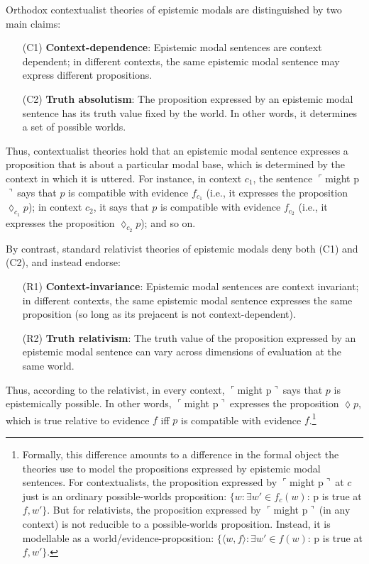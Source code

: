 \documentclass[11pt]{article}
\newcommand{\ul}{$\ulcorner$}
\newcommand{\ur}{$\urcorner\ $}
\begin{document}
\begin{doublespace}
Orthodox contextualist theories of epistemic modals are distinguished by two main claims:

\begin{itemize}
\item[(C1)] {\bf Context-dependence}: Epistemic modal sentences are context dependent; in different contexts, the same epistemic modal sentence may express different propositions.
\item[(C2)] {\bf Truth absolutism}: The proposition expressed by an epistemic modal sentence has its truth value fixed by the world. In other words, it determines a set of possible worlds.
\end{itemize}

\noindent Thus, contextualist theories hold that an epistemic modal sentence expresses a proposition that is about a particular modal base, which is determined by the context in which it is uttered. For instance, in context $c_1$, the sentence \ul might p\ur says that $p$ is compatible with evidence $f_{c_1}$ (i.e., it expresses the proposition $\lozenge_{c_1} p$); in context $c_2$, it says that $p$ is compatible with evidence $f_{c_2}$ (i.e., it expresses the proposition $\lozenge_{c_2} p$); and so on. 

By contrast, standard relativist theories of epistemic modals deny both (C1) and (C2), and instead endorse:

\begin{itemize}
\item[(R1)] {\bf Context-invariance}: Epistemic modal sentences are context invariant; in different contexts, the same epistemic modal sentence expresses the same proposition (so long as its prejacent is not context-dependent).
\item[(R2)] {\bf Truth relativism}: The truth value of the proposition expressed by an epistemic modal sentence can vary across dimensions of evaluation at the same world. 
\end{itemize}

\noindent Thus, according to the relativist, in every context, \ul might p\ur says that $p$ is epistemically possible. In other words, \ul might p\ur expresses the proposition $\lozenge p$, which is true relative to evidence $f$ iff $p$ is compatible with evidence $f$.\footnote{Formally, this difference amounts to a difference in the formal object the theories use to model the propositions expressed by epistemic modal sentences. For contextualists, the proposition expressed by \ul might p\ur at $c$ just is an ordinary possible-worlds proposition: $\{w: \exists w'\in f_c(w)$: p is true at $f,w'\}$. But for relativists, the proposition expressed by \ul might p\ur (in any context) is not reducible to a possible-worlds proposition. Instead, it is modellable as a world/evidence-proposition: $\{\langle w, f\rangle: \exists w'\in f(w)$: p is true at $f,w'\}$.}


\end{doublespace}
\end{document}
